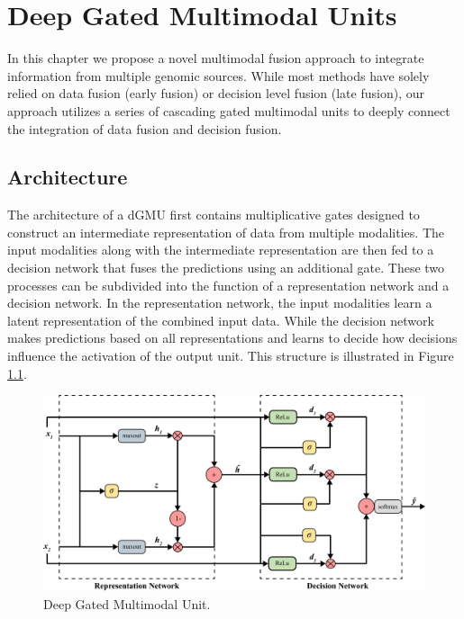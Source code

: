 \chapter{Deep Gated Multimodal Units} \label{chap:deepgmu}

In this chapter we propose a novel multimodal fusion approach to integrate information from multiple genomic sources. While most methods have solely relied on data fusion (early fusion) or decision level fusion (late fusion), our approach utilizes a series of cascading gated multimodal units to deeply connect the integration of data fusion and decision fusion.

\section{Architecture}

The architecture of a dGMU first contains multiplicative gates designed to construct an intermediate representation of data from multiple modalities. The input modalities along with the intermediate representation are then fed to a decision network that fuses the predictions using an additional gate. These two processes can be subdivided into the function of a representation network and a decision network. In the representation network, the input modalities learn a latent representation of the combined input data. While the decision network makes predictions based on all representations and learns to decide how decisions influence the activation of the output unit. This structure is illustrated in Figure \ref{fig:dgmu}. 

\begin{figure}[h!]
    \centering
    \includegraphics[width=\textwidth]{img/dGMU.png}
    \caption{Deep Gated Multimodal Unit.}
    \label{fig:dgmu}
\end{figure}

